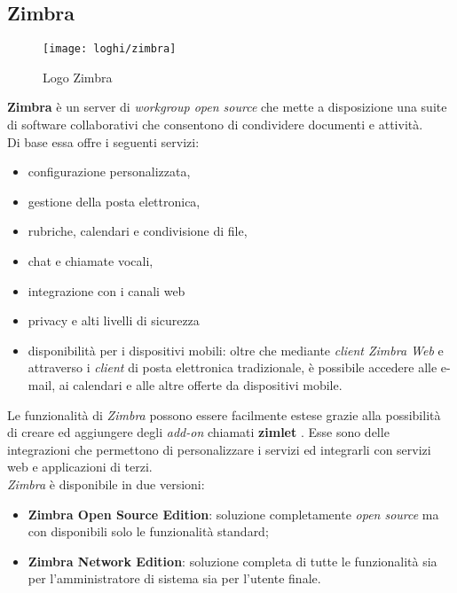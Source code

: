 \subsection{Zimbra} \label{subsec:Zimbra}
\begin{figure}[H] 
	\centering
	\texttt{[image: loghi/zimbra]}
	\caption{Logo Zimbra}
	\label{fig:logoZimbra}
\end{figure}
\textbf{Zimbra}  è un server di \emph{workgroup open source} che mette a disposizione una suite di software collaborativi che consentono di condividere documenti e attività. \\
Di base essa offre i seguenti servizi:
\begin{itemize}
	\item configurazione personalizzata,
	\item gestione della posta elettronica,
	\item rubriche, calendari e condivisione di file,
	\item chat e chiamate vocali,
	\item integrazione con i canali web
	\item privacy e alti livelli di sicurezza
	\item disponibilità per i dispositivi mobili: oltre che mediante \emph{client Zimbra Web} e attraverso i \emph{client} di posta elettronica tradizionale, è possibile accedere alle e-mail, ai calendari e alle altre offerte da dispositivi mobile. 
\end{itemize}
Le funzionalità di \emph{Zimbra} possono essere facilmente estese grazie alla possibilità di creare ed aggiungere degli \emph{add-on} chiamati \textbf{zimlet} . Esse sono delle integrazioni che permettono di personalizzare i servizi ed integrarli con servizi web e applicazioni di terzi.\\
\emph{Zimbra} è disponibile in due versioni: 
\begin{itemize}
	\item \textbf{Zimbra Open Source Edition}: soluzione completamente \emph{open source} ma con disponibili solo le funzionalità standard;
	\item \textbf{Zimbra Network Edition}: soluzione completa di tutte le funzionalità sia per l'amministratore di sistema sia per l'utente finale.
\end{itemize}


